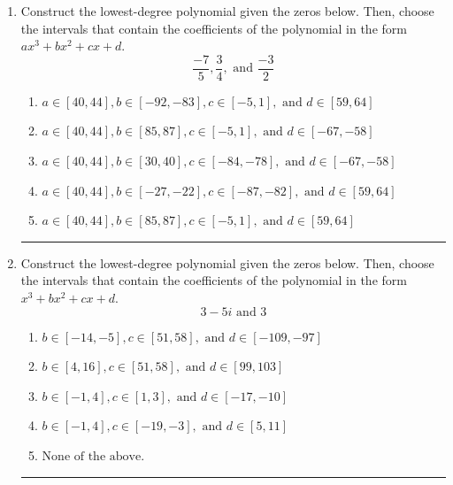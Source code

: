 \documentclass[14pt]{extbook}
\newcommand{\litem}[1]{\item#1\hspace*{-1cm}\rule{\textwidth}{0.4pt}}
\begin{document}
\begin{enumerate}
{\begin{enumerate}[label=\Alph*.]
\end{enumerate} }
\litem{
Construct the lowest-degree polynomial given the zeros below. Then, choose the intervals that contain the coefficients of the polynomial in the form $ax^3+bx^2+cx+d$.\[ \frac{-7}{5}, \frac{3}{4}, \text{ and } \frac{-3}{2} \]\begin{enumerate}[label=\Alph*.]
\item \( a \in [40, 44], b \in [-92, -83], c \in [-5, 1], \text{ and } d \in [59, 64] \)
\item \( a \in [40, 44], b \in [85, 87], c \in [-5, 1], \text{ and } d \in [-67, -58] \)
\item \( a \in [40, 44], b \in [30, 40], c \in [-84, -78], \text{ and } d \in [-67, -58] \)
\item \( a \in [40, 44], b \in [-27, -22], c \in [-87, -82], \text{ and } d \in [59, 64] \)
\item \( a \in [40, 44], b \in [85, 87], c \in [-5, 1], \text{ and } d \in [59, 64] \)

\end{enumerate} }
\litem{
Construct the lowest-degree polynomial given the zeros below. Then, choose the intervals that contain the coefficients of the polynomial in the form $x^3+bx^2+cx+d$.\[ 3 - 5 i \text{ and } 3 \]\begin{enumerate}[label=\Alph*.]
\item \( b \in [-14, -5], c \in [51, 58], \text{ and } d \in [-109, -97] \)
\item \( b \in [4, 16], c \in [51, 58], \text{ and } d \in [99, 103] \)
\item \( b \in [-1, 4], c \in [1, 3], \text{ and } d \in [-17, -10] \)
\item \( b \in [-1, 4], c \in [-19, -3], \text{ and } d \in [5, 11] \)
\item \( \text{None of the above.} \)

\end{enumerate} }
\end{enumerate}
\end{document}

